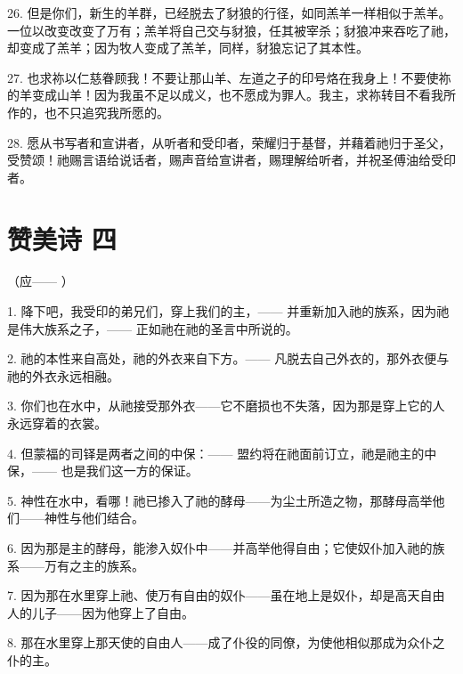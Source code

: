 26. 但是你们，新生的羊群，已经脱去了豺狼的行径，如同羔羊一样相似于羔羊。一位以改变改变了万有；羔羊将自己交与豺狼，任其被宰杀；豺狼冲来吞吃了祂，却变成了羔羊；因为牧人变成了羔羊，同样，豺狼忘记了其本性。\par

27. 也求祢以仁慈眷顾我！不要让那山羊、左道之子的印号烙在我身上！不要使祢的羊变成山羊！因为我虽不足以成义，也不愿成为罪人。我主，求祢转目不看我所作的，也不只追究我所愿的。\par

28. 愿从书写者和宣讲者，从听者和受印者，荣耀归于基督，并藉着祂归于圣父，受赞颂！祂赐言语给说话者，赐声音给宣讲者，赐理解给听者，并祝圣傅油给受印者。\par


\section{赞美诗 四}

（应—— ）\par

1. 降下吧，我受印的弟兄们，穿上我们的主，—— 并重新加入祂的族系，因为祂是伟大族系之子，—— 正如祂在祂的圣言中所说的。\par

2. 祂的本性来自高处，祂的外衣来自下方。—— 凡脱去自己外衣的，那外衣便与祂的外衣永远相融。\par

3. 你们也在水中，从祂接受那外衣——它不磨损也不失落，因为那是穿上它的人永远穿着的衣裳。\par

4. 但蒙福的司铎是两者之间的中保：—— 盟约将在祂面前订立，祂是祂主的中保，—— 也是我们这一方的保证。\par

5. 神性在水中，看哪！祂已掺入了祂的酵母——为尘土所造之物，那酵母高举他们——神性与他们结合。\par

6. 因为那是主的酵母，能渗入奴仆中——并高举他得自由；它使奴仆加入祂的族系——万有之主的族系。\par

7. 因为那在水里穿上祂、使万有自由的奴仆——虽在地上是奴仆，却是高天自由人的儿子——因为他穿上了自由。\par

8. 那在水里穿上那天使的自由人——成了仆役的同僚，为使他相似那成为众仆之仆的主。\par

